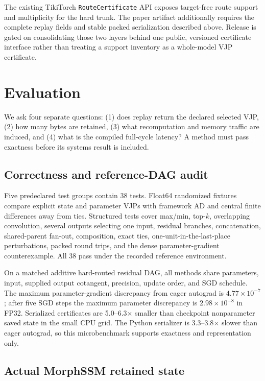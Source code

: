 \documentclass[10pt]{article}
\newcommand{\code}[1]{\texttt{#1}}
\begin{document}
The existing TikiTorch \code{RouteCertificate} API exposes target-free route
support and multiplicity for the hard trunk.  The paper artifact additionally
requires the complete replay fields and stable packed serialization described
above.  Release is gated on consolidating those two layers behind one public,
versioned certificate interface rather than treating a support inventory as a
whole-model VJP certificate.

\section{Evaluation}

We ask four separate questions: (1) does replay return the declared selected
VJP, (2) how many bytes are retained, (3) what recomputation and memory traffic
are induced, and (4) what is the compiled full-cycle latency?  A method must
pass exactness before its systems result is included.

\subsection{Correctness and reference-DAG audit}

Five predeclared test groups contain 38 tests.  Float64 randomized fixtures
compare explicit state and parameter VJPs with framework AD and central finite
differences away from ties.  Structured tests cover max/min, top-$k$,
overlapping convolution, several outputs selecting one input, residual
branches, concatenation, shared-parent fan-out, composition, exact ties,
one-unit-in-the-last-place perturbations, packed round trips, and the dense
parameter-gradient counterexample.  All 38 pass under the recorded reference
environment.

On a matched additive hard-routed residual DAG, all methods share parameters,
input, supplied output cotangent, precision, update order, and SGD schedule.
The maximum parameter-gradient discrepancy from eager autograd is
$4.77\times10^{-7}$; after five SGD steps the maximum parameter discrepancy is
$2.98\times10^{-8}$ in FP32.  Serialized certificates are 5.0--6.3$\times$
smaller than checkpoint nonparameter saved state in the small CPU grid.  The
Python serializer is 3.3--3.8$\times$ slower than eager autograd, so this
microbenchmark supports exactness and representation only.

\subsection{Actual MorphSSM retained state}
\end{document}
